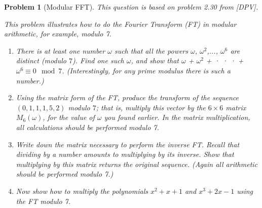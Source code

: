 \documentclass[10pt]{article}
\newtheorem{problem}{\sc\color{cit}Problem}
\begin{document}
\newpage



\begin{problem}[Modular FFT]
This question is based on problem 2.30 from [DPV].

This problem illustrates how to do the Fourier Transform (FT) in modular arithmetic, for example, modulo 7.
\begin{enumerate}
    \item[(a)] There is at least one number $\omega$ such that all the powers $\omega$, $\omega^2$,..., $\omega^6$ are distinct (modulo $7$). Find one such $\omega$, and show that $\omega$ + $\omega^2$ + · · · + $\omega^6 \equiv 0 \mod 7$. (Interestingly, for any prime modulus there is such a number.)
    \item[(b)] Using the matrix form of the FT, produce the transform of the sequence $(0,1,1,1,5,2)$ modulo $7$; that is, multiply this vector by the $6\times 6$ matrix $M_6(\omega)$, for the value of $\omega$ you found earlier. In the matrix multiplication, all calculations should be performed modulo 7.
    \item[(c)] Write down the matrix necessary to perform the inverse FT. Recall that dividing by a number amounts to multiplying by its inverse. Show that multiplying by this matrix returns the original sequence. (Again all arithmetic should be performed modulo 7.)
    \item[(d)] Now show how to multiply the polynomials $x^2 + x + 1$ and $x^3 + 2x - 1$ using the FT modulo 7.
\end{enumerate}
\end{problem}
\end{document}
